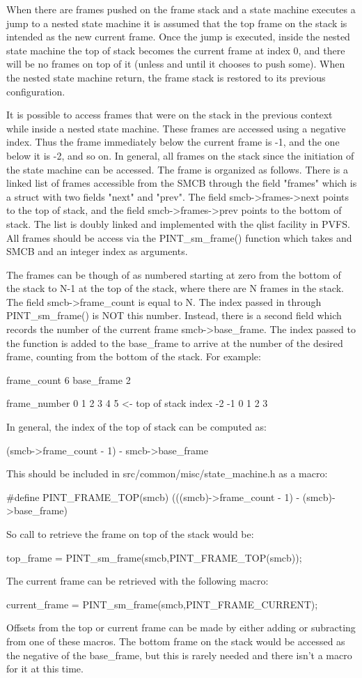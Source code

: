 When there are frames pushed on the frame stack and a state machine executes a
jump to a nested state machine it is assumed that the top frame on the stack
is intended as the new current frame.  Once the jump is executed, inside the
nested state machine the top of stack becomes the current frame at index 0, and
there will be no frames on top of it (unless and until it chooses to push some).
When the nested state machine return, the frame stack is restored to its
previous configuration.

It is possible to access frames that were on the stack in the previous context
while inside a nested state machine.  These frames are accessed using a negative
index.  Thus the frame immediately below the current frame is -1, and the one
below it is -2, and so on.  In general, all frames on the stack since the
initiation of the state machine can be accessed.  The frame is organized as
follows.  There is a linked list of frames accessible from the SMCB through the
field "frames" which is a struct with two fields "next" and "prev".  The field
smcb->frames->next points to the top of stack, and the field smcb->frames->prev
points to the bottom of stack.  The list is doubly linked and implemented with
the qlist facility in PVFS.  All frames should be access via the PINT_sm_frame()
function which takes and SMCB and an integer index as arguments.

The frames can be though of as numbered starting at zero from the bottom of the
stack to N-1 at the top of the stack, where there are N frames in the stack. 
The field smcb->frame_count is equal to N.  The index passed in through 
PINT_sm_frame() is NOT this number.  Instead, there is a second field which
records the number of the current frame smcb->base_frame.  The index passed to
the function is added to the base_frame to arrive at the number of the desired
frame, counting from the bottom of the stack.  For example:

frame_count 6
base_frame 2

frame_number     0  1  2  3  4  5  <- top of stack
index           -2 -1  0  1  2  3

In general, the index of the top of stack can be computed as:

(smcb->frame_count - 1) - smcb->base_frame

This should be included in src/common/misc/state_machine.h as a macro:

#define PINT_FRAME_TOP(smcb) (((smcb)->frame_count - 1) - (smcb)->base_frame)

So call to retrieve the frame on top of the stack would be:

top_frame = PINT_sm_frame(smcb,PINT_FRAME_TOP(smcb));

The current frame can be retrieved with the following macro:

current_frame = PINT_sm_frame(smcb,PINT_FRAME_CURRENT);

Offsets from the top or current frame can be made by either adding or subracting
from one of these macros.  The bottom frame on the stack would be accessed as
the negative of the base_frame, but this is rarely needed and there isn't a 
macro for it at this time.
